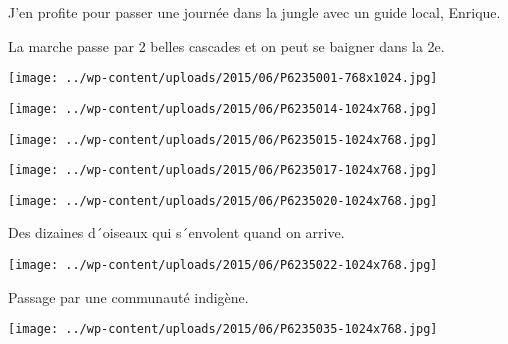  

 J'en profite pour passer une journée dans la jungle avec un guide local, Enrique. 

 La marche passe par 2 belles cascades et on peut se baigner dans la 2e. 

 

\begin{center} \texttt{[image: ../wp-content/uploads/2015/06/P6235001-768x1024.jpg]} \end{center}

 

 

\begin{center} \texttt{[image: ../wp-content/uploads/2015/06/P6235014-1024x768.jpg]} \end{center}

 

 

\begin{center} \texttt{[image: ../wp-content/uploads/2015/06/P6235015-1024x768.jpg]} \end{center}

 

 

\begin{center} \texttt{[image: ../wp-content/uploads/2015/06/P6235017-1024x768.jpg]} \end{center}

 

 

\begin{center} \texttt{[image: ../wp-content/uploads/2015/06/P6235020-1024x768.jpg]} \end{center}

 

 Des dizaines d´oiseaux qui s´envolent quand on arrive. 

 

\begin{center} \texttt{[image: ../wp-content/uploads/2015/06/P6235022-1024x768.jpg]} \end{center}

 

 Passage par une communauté indigène. 

 

\begin{center} \texttt{[image: ../wp-content/uploads/2015/06/P6235035-1024x768.jpg]} \end{center}

